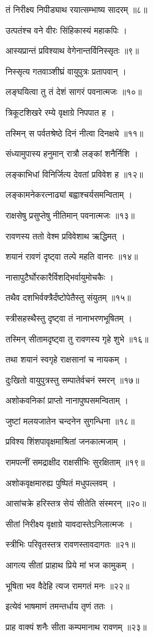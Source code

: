 तं निरीक्ष्य निपीड्याथ रयात्सम्भाष्य सादरम् ॥८॥

उत्पतंश्च वने वीरः सिंहिकास्यं महाकपिः ।

आस्यप्रान्तं प्रविश्याथ वेगेनान्तर्विनिस्सृतः ॥९॥

निस्सृत्य गतवाञ्शीघ्रं वायुपुत्रः प्रतापवान् ।

लङ्घयित्वा तु तं देशं सागरं पवनात्मजः ॥१०॥

त्रिकूटशिखरे रम्ये वृक्षाग्रे निपपात ह ।

तस्मिन् स पर्वतश्रेष्ठे दिनं नीत्वा दिनक्षये ॥११॥

संध्यामुपास्य हनुमान् रात्रौ लङ्कां शनैर्निशि ।

लङ्काभिधां विनिर्जित्य देवतां प्रविवेश ह ॥१२॥

लङ्कामनेकरत्नाढ्यां बह्वाश्चर्यसमन्विताम् ।

राक्षसेषु प्रसुप्तेषु नीतिमान् पवनात्मजः ॥१३॥

रावणस्य ततो वेश्म प्रविवेशाथ ऋद्धिमत् ।

शयानं रावणं दृष्ट्वा तल्पे महति वानरः ॥१४॥

नासापुटैर्घोरकारैर्विशद्भिर्वायुमोचकैः ।

तथैव दशभिर्वक्त्रैर्दंष्टोपेतैस्तु संयुतम् ॥१५॥

स्त्रीसहस्थैस्तु दृष्ट्वा तं नानाभरणभूषितम् ।

तस्मिन् सीतामदृष्ट्वा तु रावणस्य गृहे शुभे ॥१६॥

तथा शयानं स्वगृहे राक्षसानां च नायकम् ।

दुःखितो वायुपुत्रस्तु सम्पातेर्वचनं स्मरन् ॥१७॥

अशोकवनिकां प्राप्तो नानापुष्पसमन्विताम् ।

जुष्टां मलयजातेन चन्दनेन सुगन्धिना ॥१८॥

प्रविश्य शिंशपावृक्षमाश्रितां जनकात्मजाम् ।

रामपत्नीं समद्राक्षीद राक्षसीभिः सुरक्षिताम् ॥१९॥

अशोकवृक्षमारुह्य पुष्पितं मधुपल्लवम् ।

आसांचक्रे हरिस्तत्र सेयं सीतेति संस्मरन् ॥२०॥

सीतां निरीक्ष्य वृक्षाग्रे यावदास्तेऽनिलात्मजः ।

स्त्रीभिः परिवृतस्तत्र रावणस्तावदागतः ॥२१॥

आगत्य सीतां प्राहाथ प्रिये मां भज कामुकम् ।

भूषिता भव वैदेहि त्यज रामगतं मनः ॥२२॥

इत्येवं भाषमाणं तमन्तर्धाय तृणं ततः ।

प्राह वाक्यं शनैः सीता कम्पमानाथ रावणम् ॥२३॥

